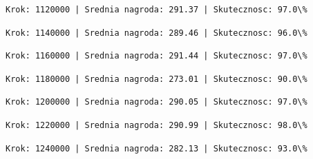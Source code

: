 \documentclass[11pt]{article}
\begin{document}
    
    
    \begin{Verbatim}[commandchars=\\\{\}]
Krok: 1120000 | Srednia nagroda: 291.37 | Skutecznosc: 97.0\%

    \end{Verbatim}

    
    
    \begin{Verbatim}[commandchars=\\\{\}]
Krok: 1140000 | Srednia nagroda: 289.46 | Skutecznosc: 96.0\%

    \end{Verbatim}

    
    
    \begin{Verbatim}[commandchars=\\\{\}]
Krok: 1160000 | Srednia nagroda: 291.44 | Skutecznosc: 97.0\%

    \end{Verbatim}

    
    
    \begin{Verbatim}[commandchars=\\\{\}]
Krok: 1180000 | Srednia nagroda: 273.01 | Skutecznosc: 90.0\%

    \end{Verbatim}

    
    
    \begin{Verbatim}[commandchars=\\\{\}]
Krok: 1200000 | Srednia nagroda: 290.05 | Skutecznosc: 97.0\%

    \end{Verbatim}

    
    
    \begin{Verbatim}[commandchars=\\\{\}]
Krok: 1220000 | Srednia nagroda: 290.99 | Skutecznosc: 98.0\%

    \end{Verbatim}

    
    
    \begin{Verbatim}[commandchars=\\\{\}]
Krok: 1240000 | Srednia nagroda: 282.13 | Skutecznosc: 93.0\%

    \end{Verbatim}
\end{document}
